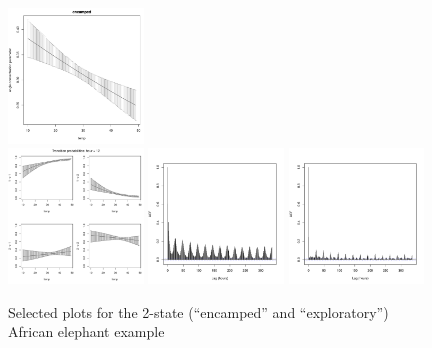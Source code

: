 \documentclass[12pt]{article}\usepackage[]{graphicx}\usepackage[]{color}
\begin{document}
\begin{figure}[htbp]
  \includegraphics[width=0.32\textwidth]{plot_elephantResults010.pdf} \\
  \includegraphics[width=0.32\textwidth]{plot_elephantResults013.pdf}
  \includegraphics[width=0.32\textwidth]{plot_elephantResults017.pdf}
  \includegraphics[width=0.32\textwidth]{plot_elephantResults016.pdf} \\
  \caption{Selected plots for the 2-state (``encamped'' and ``exploratory'') African elephant example%
}
\end{figure}
\end{document}
